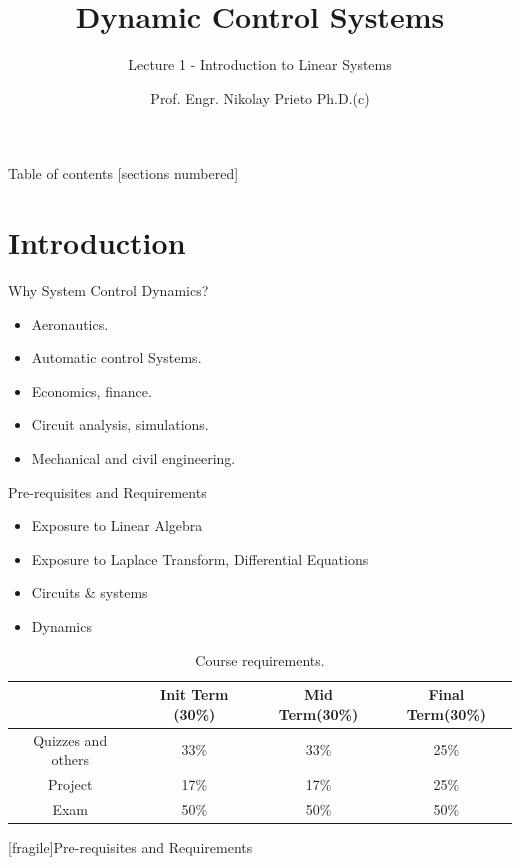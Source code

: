 \documentclass[10pt]{beamer}
\title{Dynamic Control Systems}
\subtitle{Lecture 1 - Introduction to Linear Systems}
\date{}
\author{Prof. Engr. Nikolay Prieto Ph.D.(c)}
\institute{Escuela Colombiana de Carreras Industriales - ECCI}
\begin{document}
\maketitle

\begin{frame}{Table of contents}
  [sections numbered]
  \tableofcontents[hideallsubsections]
\end{frame}

\section{Introduction}

\begin{frame}[fragile]{Why System Control Dynamics?}
  \begin{itemize}[<+- | alert@+>]
    \item Aeronautics.
    \item Automatic control Systems.
    \item Economics, finance.
    \item Circuit analysis, simulations.
    \item Mechanical and civil engineering.
  \end{itemize}
\end{frame}

\begin{frame}[fragile]{Pre-requisites and Requirements}
    \begin{itemize}
        \item Exposure to Linear Algebra
        \item Exposure to Laplace Transform, Differential Equations
        \item Circuits \& systems
        \item Dynamics 
    \end{itemize}

    
    \begin{table}
    \begin{centering}
    \begin{tabular}{|c|c|c|c|}
    \hline 
     & Init Term (30\%) & Mid Term(30\%) & Final Term(30\%)\tabularnewline
    \hline 
    \hline 
    Quizzes and others & 33\% & 33\% & 25\%\tabularnewline
    \hline 
    Project & 17\% & 17\% & 25\%\tabularnewline
    \hline 
    Exam & 50\% & 50\% & 50\%\tabularnewline
    \hline 
    \end{tabular}
    \par\end{centering}
    \caption{Course requirements.}
    \end{table}

\end{frame}[fragile]{Pre-requisites and Requirements}

\begin{frame}

\end{frame}
\end{document}
